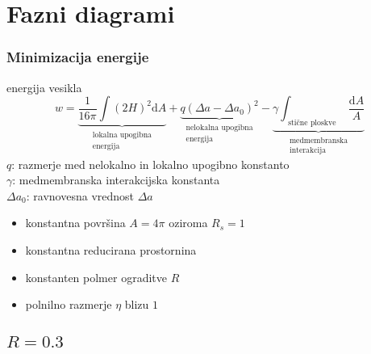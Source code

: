 \documentclass[slovene]{beamer}
\newcommand{\dif}{\mathrm{d}}
\begin{document}
\section{Fazni diagrami}
	\begin{frame}
		\frametitle{Minimizacija energije}
		\begin{block}{energija vesikla}
		\vspace*{-\baselineskip}\setlength\belowdisplayshortskip{0pt}
			\begin{equation}
			w=\underbrace{\frac{1}{16\pi}\int (2H)^2\dif A}_{\substack{\text{lokalna upogibna} \\ \text{energija} }} + \underbrace{ q(\Delta a-\Delta a_0)^2 }_{\substack{\text{nelokalna upogibna} \\ \text{energija}}}-        \underbrace{ \gamma\int_{\substack{ \text{stične ploskve}}} \frac{\dif A}{A} }_{\substack{\text{medmembranska} \\ \text{interakcija}}} 
			\nonumber
			\end{equation}
			$q$: razmerje med nelokalno in lokalno upogibno konstanto\\
			$\gamma$: medmembranska interakcijska konstanta\\
			$\Delta a_0$: ravnovesna vrednost $\Delta a$
		\end{block}
			\begin{itemize}
				\item konstantna površina $A=4\pi$ oziroma $R_s=1$
				\item konstantna reducirana prostornina
				\item konstanten polmer ograditve $R$
				\item polnilno razmerje $\eta$ blizu $1$ 
			\end{itemize}
	\end{frame}
	
	
\subsection{$R=0.3$}
\end{document}
